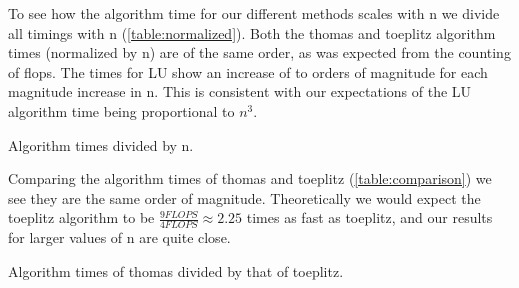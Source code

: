 To see how the algorithm time for our different methods scales with n we divide
all timings with n (\cref{table:normalized}). Both the thomas and toeplitz
algorithm times (normalized by n) are of the same order, as was expected from
the counting of flops. The times for LU show an increase of to orders of magnitude
for each magnitude increase in n. This is consistent with our expectations
of the LU algorithm time being proportional to $n^3$.

\begin{table}[htp]
  \centering
  \caption{Algorithm times divided by n.}
  \label{table:normalized}
\end{table}


Comparing the algorithm times of thomas and toeplitz (\cref{table:comparison})
we see they are the same order of magnitude. Theoretically we would
expect the toeplitz algorithm to be $\frac{9 FLOPS}{4 FLOPS} \approx 2.25$ times as fast as
toeplitz, and our results for larger values of n are quite close.

\begin{table}[htp]
  \centering
  \caption{Algorithm times of thomas divided by that of toeplitz.}
  \label{table:comparison}
\end{table}
